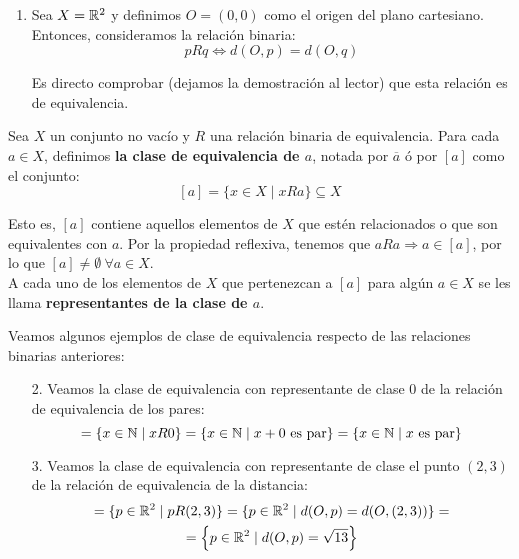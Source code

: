 \begin{ejemplo}
\begin{enumerate}
    \item Sea $X=\mathbb{R}^2$ y definimos $O=(0,0)$ como el origen del plano cartesiano. Entonces, consideramos la relación binaria:
    \begin{equation*}
        pRq \Longleftrightarrow d(O,p) = d(O,q)
    \end{equation*}

    Es directo comprobar (dejamos la demostración al lector) que esta relación es de equivalencia.
\end{enumerate}
\end{ejemplo}

\begin{definicion}
    Sea $X$ un conjunto no vacío y $R$ una relación binaria de equivalencia. Para cada $a \in X$, definimos \textbf{la clase de equivalencia de $a$}, notada por $\overline{a}$ ó por $[a]$ como el conjunto:
    $$[a] = \{x \in X \mid xRa\} \subseteq X$$
\end{definicion}

Esto es, $[a]$ contiene aquellos elementos de $X$ que estén relacionados o que son equivalentes con $a$.
Por la propiedad reflexiva, tenemos que $aRa \Rightarrow a \in [a]$, por lo que $ [a] \neq \emptyset~\forall a \in X$.\\


A cada uno de los elementos de $X$ que pertenezcan a $[a]$ para algún $a \in X$ se les llama \textbf{representantes de la clase de $a$}.

\begin{ejemplo} Veamos algunos ejemplos de clase de equivalencia respecto de las relaciones binarias anteriores:
\begin{enumerate}
    \item[2.] Veamos la clase de equivalencia con representante de clase $0$ de la relación de equivalencia de los pares:
    \begin{equation*}
        [0] = \{x\in \bb{N}\mid xR0\} = \{x\in \bb{N}\mid x+0 \text{ es par}\} = \{x\in \bb{N}\mid x \text{ es par}\}
    \end{equation*}

    \item[3.] Veamos la clase de equivalencia con representante de clase el punto $(2,3)$ de la relación de equivalencia de la distancia:
    \begin{multline*}
        [(2,3)] = \{p\in \bb{R}^2\mid pR(2,3)\} = \{p\in \bb{R}^2\mid d(O,p)=d(O,(2,3))\} =\\= \left\{p\in \bb{R}^2\mid d(O,p)=\sqrt{13}\right\}
    \end{multline*}
\end{enumerate}
\end{ejemplo}

